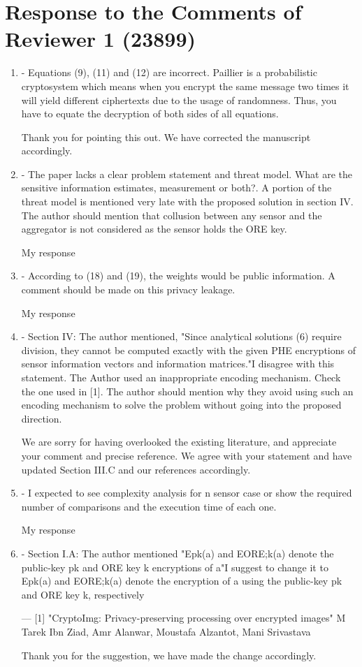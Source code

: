 \documentclass[a4paper]{scrartcl}
\newenvironment{rebuttal}{\begin{enumerate}[label={\color{grey}\thesection.\arabic{enumi}},leftmargin=0pt,ref=\thesection.\arabic{enumi}]}{\end{enumerate}}
\newcommand{\reviewtext}[1]{{\color{nblue} #1}}
\begin{document}
\section*{Response to the Comments of Reviewer 1 (23899)}
\def\thesection{R1}
\begin{rebuttal}
\item \reviewtext{- Equations (9), (11) and (12) are incorrect. Paillier is a
probabilistic cryptosystem which means when you encrypt the same
message two times it will yield different ciphertexts due to the usage
of randomness. Thus, you have to equate the decryption of both sides of
all equations. }

Thank you for pointing this out. We have corrected the manuscript accordingly.

\item \reviewtext{- The paper lacks a clear problem statement and threat model. What are
the sensitive information estimates, measurement or both?. A portion of
the threat model is mentioned very late with the proposed solution in
section IV. The author should mention that collusion between any sensor
and the aggregator is not considered as the sensor holds the ORE key. }

My response

\item \reviewtext{- According to (18) and (19), the weights would be public information.
A comment should be made on this privacy leakage.}

My response

\item \reviewtext{- Section IV: The author mentioned, "Since analytical solutions (6)
require division, they cannot be computed exactly with the given PHE
encryptions of sensor information vectors and information matrices."I
disagree with this statement. The Author used an inappropriate encoding
mechanism. Check the one used in [1]. The author should mention why
they avoid using such an encoding mechanism to solve the problem
without going into the proposed direction. }

We are sorry for having overlooked the existing literature, and appreciate your comment and precise reference. We agree with your statement and have updated Section III.C and our references accordingly.

\item \reviewtext{- I expected to see complexity analysis for n sensor case or show the
required number of comparisons and the execution time of each one. }

My response

\item \reviewtext{- Section I.A: The author mentioned 
"Epk(a) and EORE;k(a) denote the public-key pk and ORE key k
encryptions of a"I suggest to change it to 
Epk(a) and EORE;k(a) denote the encryption of a using the public-key pk
and ORE key k, respectively

---
[1] "CryptoImg: Privacy-preserving processing over encrypted images" M
Tarek Ibn Ziad, Amr Alanwar, Moustafa Alzantot, Mani Srivastava}

Thank you for the suggestion, we have made the change accordingly.

\end{rebuttal}
\end{document}
